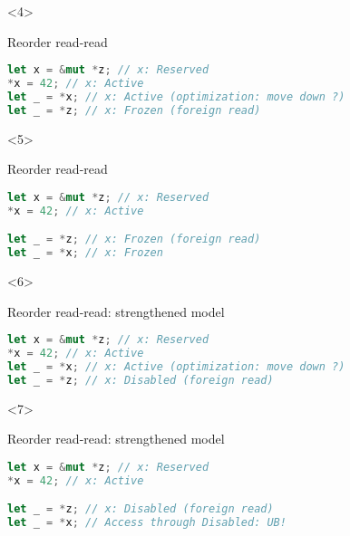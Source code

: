 \begin{frame}[fragile, t]

    \begin{onlyenv}<4>
        \begin{block}{{\cmark} Reorder read-read}
            \begin{lstlisting}[language=rust]
let x = &mut *z; // x: Reserved
*x = 42; // x: Active
let _ = *x; // x: Active (optimization: move down ?)
let _ = *z; // x: Frozen (foreign read)

            \end{lstlisting}
        \end{block}
    \end{onlyenv}

    \begin{onlyenv}<5>
        \begin{block}{{\cmark} Reorder read-read}
            \begin{lstlisting}[language=rust]
let x = &mut *z; // x: Reserved
*x = 42; // x: Active

let _ = *z; // x: Frozen (foreign read)
let _ = *x; // x: Frozen
            \end{lstlisting}
        \end{block}
    \end{onlyenv}

    \begin{onlyenv}<6>
        \begin{block}{{\xmark} Reorder read-read: strengthened model}
            \begin{lstlisting}[language=rust]
let x = &mut *z; // x: Reserved
*x = 42; // x: Active
let _ = *x; // x: Active (optimization: move down ?)
let _ = *z; // x: Disabled (foreign read)

            \end{lstlisting}
        \end{block}
    \end{onlyenv}

    \begin{onlyenv}<7>
        \begin{block}{{\xmark} Reorder read-read: strengthened model}
            \begin{lstlisting}[language=rust]
let x = &mut *z; // x: Reserved
*x = 42; // x: Active

let _ = *z; // x: Disabled (foreign read)
let _ = *x; // Access through Disabled: UB!
            \end{lstlisting}
        \end{block}
    \end{onlyenv}
\end{frame}

